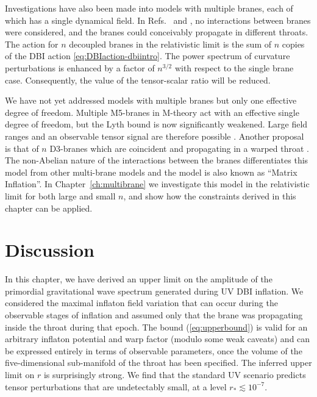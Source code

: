 Investigations have also been made into models with multiple branes, each of which
has a single dynamical field. In Refs.~\cite{Cai:2008if} and \cite{Cai:2009hw}, no
interactions between branes were considered, and the branes could conceivably propagate in different
throats. The action for $n$ decoupled branes in the
relativistic limit is the sum of $n$ copies of the DBI action
\eqref{eq:DBIaction-dbiintro}. The power spectrum of curvature perturbations is
enhanced by a factor of $n^{3/2}$ with respect to the single brane case. Consequently, the value
of the tensor-scalar ratio will be reduced. 


We have not yet addressed models with multiple branes but only one effective
degree of freedom. Multiple M5-branes in M-theory act with an effective
single degree of freedom, but the Lyth bound is now significantly weakened. Large
field ranges and an observable tensor signal are therefore possible \cite{Krause:2007jr}. 
Another proposal is that of $n$ D3-branes which are coincident and propagating in a
warped throat \cite{thomasward, hltw, Ward:2007gs, Berndsen:2009ww}. The
non-Abelian nature of the interactions between the branes differentiates this model
from other multi-brane models and the model is also known as ``Matrix Inflation''.
In Chapter~\ref{ch:multibrane} we
investigate this model in the relativistic limit
for both large and small $n$, and show how the constraints derived in this
chapter can be applied.


% 
% 
% 
\section{Discussion}
\label{sec:conclusion-dbi}

In this chapter, we have derived an upper limit on
the amplitude of the primordial gravitational wave spectrum
generated during UV DBI inflation. We considered   
the maximal inflaton field variation   
that can occur during the observable stages of inflation and assumed  
only that the brane was propagating inside the throat during that epoch. 
The bound (\ref{eq:upperbound}) is valid for an arbitrary inflaton potential and 
warp factor (modulo some weak caveats) and can be expressed 
entirely in terms of observable parameters, once the volume of 
the five-dimensional sub-manifold of the throat has been specified. 
The inferred upper limit on $r$ is surprisingly strong. 
We find that the standard UV  
scenario predicts tensor perturbations that are undetectably small, 
at a level ${r_*} \lesssim {10^{-7}}$. 

